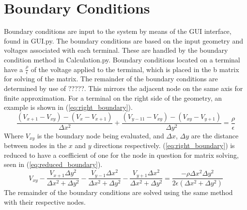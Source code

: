 \documentclass{article}[12pt]
\begin{document}
\section{Boundary Conditions}
	Boundary conditions are input to the system by means of the GUI interface, found in GUI.py. The boundary conditions are based on the input geometry and voltages associated with each terminal. These are handled by the boundary condition method in Calculation.py. Boundary conditions located on a terminal have a $\frac{\rho}{\epsilon}$ of the voltage applied to the terminal, which is placed in the b matrix for solving of the matrix. The remainder of the boundary conditions are determined by use of ?????. This mirrors the adjacent node on the same axis for finite approximation. For a terminal on the right side of the geometry, an example is shown in (\ref{eq:right_boundary}).
	\begin{equation}
		\frac{\left(V_{x+1}-V_{xy}\right)-\left(V_x-V_{x+1}\right)}{\Delta x^2}+\frac{\left(V_{y-11}-V_{xy}\right)-\left(V_{xy}-V_{y+1}\right)}{\Delta y^2}=\frac{\rho}{\epsilon}
		\label{eq:right_boundary}
	\end{equation}
Where $V_{xy}$ is the boundary node being evaluated, and $\Delta x$, $\Delta y$ are the distance between nodes in the $x$ and $y$ directions respectively. (\ref{eq:right_boundary}) is reduced to have a coefficient of one for the node in question for matrix solving, seen in (\ref{eq:reduced_boundary}).
	\begin{equation}
		V_{xy}-\frac{V_{x+1}\Delta y^2}{\Delta x^2+\Delta y^2}-\frac{V_{y-1}\Delta x^2}{\Delta  x^2+\Delta y^2}-\frac{V_{y+1}\Delta x^2}{\Delta  x^2+\Delta y^2}=\frac{-\rho \Delta  x^2 \Delta y^2}{2\epsilon\left(\Delta x^2+\Delta y^2\right)}
		\label{eq:reduced_boundary}
	\end{equation}
The remainder of the boundary conditions are solved using the same method with their respective nodes. 
\end{document}
